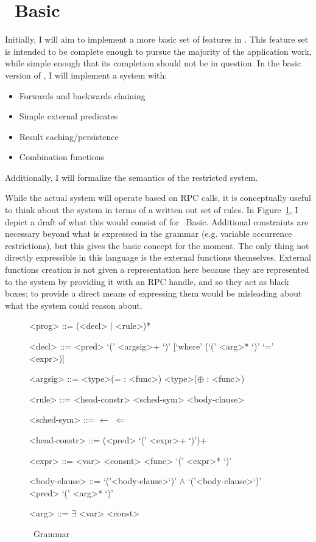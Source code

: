 \section{\sysname\ Basic}
\label{sec:holmesBasic}
Initially, I will aim to implement a more basic set of features in \sysname.
This feature set is intended to be complete enough to pursue the majority of the application work, while simple enough that its completion should not be in question.
In the basic version of \sysname, I will implement a system with:
\begin{itemize}
\item Forwards and backwards chaining
\item Simple external predicates
\item Result caching/persistence
\item Combination functions
\end{itemize}
Additionally, I will formalize the semantics of the restricted system.

While the actual system will operate based on RPC calls, it is conceptually useful to think about the system in terms of a written out set of rules.
In Figure~\ref{fig:holmesGrammar}, I depict a draft of what this would consist of for \sysname\ Basic.
Additional constraints are necessary beyond what is expressed in the grammar (e.g. variable occurrence restrictions), but this gives the basic concept for the moment.
The only thing not directly expressible in this language is the external functions themselves.
External functions creation is not given a representation here because they are represented to the system by providing it with an RPC handle, and so they act as black boxes;
to provide a direct means of expressing them would be misleading about what the system could reason about.

\begin{figure}
\begin{grammar}

<prog> ::= (<decl> | <rule>)*

<decl> ::= <pred> `(' <argsig>+ `)' [`where' (`(' <arg>* `)' `=' <expr>)]

<argsig>
::=  <type>(= : <func>)
\alt <type>($\oplus$ : <func>)

<rule> ::= <head-constr> <sched-sym> <body-clause>

<sched-sym> ::= $\leftarrow$
\alt $\Leftarrow$

<head-constr> ::= (<pred> `(' <expr>+ `)')+

<expr> ::= <var>
\alt <consnt>
\alt <func> `(' <expr>* `)'

<body-clause>
::=  `('<body-clause>`)' $\wedge$ `('<body-clause>`)'
\alt <pred> `(' <arg>* `)'

<arg> ::= $\exists$ \alt <var> \alt <const>
\end{grammar}
\label{fig:holmesGrammar}
\caption{\sysname\ Grammar}
\end{figure}

